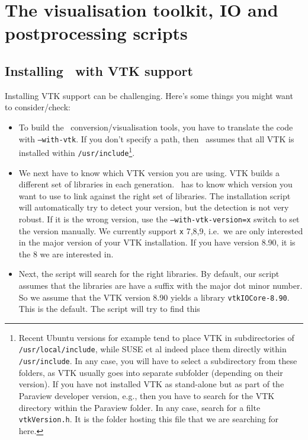\chapter{The visualisation toolkit, IO and postprocessing scripts}
\label{chapter:vtk}

\section{Installing \Peano\ with VTK support}
Installing VTK support can be challenging. 
Here's some things you might want to consider/check:

\begin{itemize}
  \item To build the \Peano\ conversion/visualisation tools, you have to
  translate the code with \texttt{--with-vtk}. If you don't
  specify a path, then \Peano\ assumes that all VTK is installed 
  within \texttt{/usr/include}\footnote{Recent Ubuntu
  versions for example tend to place VTK in subdirectories of
  \texttt{/usr/local/include}, while SUSE et al indeed place them directly
  within \texttt{/usr/include}. In any case, you will have to select a
  subdirectory from these folders, as VTK usually goes into separate subfolder (depending on their
  version). If you have not installed VTK as stand-alone but as part of the
  Paraview developer version, e.g., then you have to search for the VTK
  directory within the Paraview folder. In any case, search for a
  filte \texttt{vtkVersion.h}. It is the folder hosting this file that we are
  searching for here.}.
  \item We next have to know which VTK version you are using. VTK builds a
  different set of libraries in each generation. \Peano\ has to know which
  version you want to use to link against the right set of libraries. The
  installation script will automatically try to detect your version, but the
  detection is not very robust. If it is the wrong version, use the
  \texttt{--with-vtk-version=x} switch to set the version manually. We currently
  support \texttt{x} 7,8,9, i.e.~we are only interested in the major version of
  your VTK installation. If you have version 8.90, it is the 8 we are interested
  in.
  \item Next, the script will search for the right libraries. By default, our
  script assumes that the libraries are have a suffix with the major dot minor
  number. So we assume that the VTK version 8.90 yields a library
  \texttt{vtkIOCore-8.90}. This is the default. The script will try to find this

\end{itemize}
